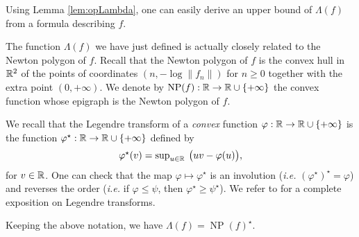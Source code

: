 \documentclass{lms}
\DeclareMathOperator{\NP}{NP}
\begin{document}
\begin{rem}
\label{rem:opLambda}
Using Lemma \ref{lem:opLambda}, one can easily derive an upper 
bound of $\Lambda(f)$ from a formula describing $f$.
\end{rem}

The function $\Lambda(f)$ we have just defined is actually closely 
related to the Newton polygon of $f$. Recall that the 
Newton polygon of $f$ is the convex hull in $\mathbb R^2$ of the points of 
coordinates $(n, - \log \lVert f_n \rVert )$ for $n \geq 0$ together 
with the extra point $(0, +\infty)$. We denote by $\NP(f) : \R \to \R 
\cup \{+\infty\}$ the convex function whose epigraph is the Newton 
polygon of $f$.

We recall that the Legendre transform of a \emph{convex} function 
$\varphi : \mathbb R \to \mathbb R \cup \{+\infty\}$ is the function $\varphi^\star : 
\mathbb R \to \mathbb R \cup \{+\infty\}$ defined by
\[
\textstyle \varphi^\star(v) = \sup_{u \in \mathbb R} \:
\big(uv - \varphi(u)\big),
\]
for $v \in \mathbb R$.
One can check that the map $\varphi \mapsto \varphi^\star$ is an
involution (\emph{i.e.} $(\varphi^\star)^\star = \varphi$) and
reverses the order (\emph{i.e.} if $\varphi \leq \psi$, then
$\varphi^\star \geq \psi^\star$). We refer to \cite{Rockafellar:97}
for a complete exposition on Legendre transforms.

%

\begin{prop} \label{prop:lambdaNP}
Keeping the above notation, we have $\Lambda (f) = \NP(f)^\star$.
\end{prop}
\end{document}
